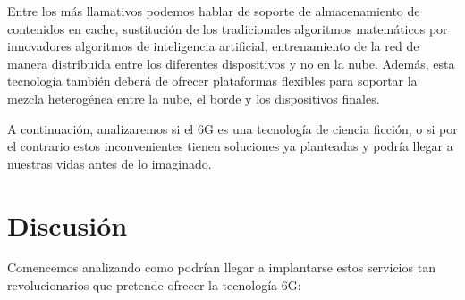 Entre los más llamativos podemos hablar de soporte de almacenamiento de contenidos en cache, sustitución de los tradicionales algoritmos matemáticos por innovadores algoritmos de inteligencia artificial, entrenamiento de la red de manera distribuida entre los diferentes dispositivos y no en la nube. Además, esta tecnología también deberá de ofrecer plataformas flexibles para soportar la mezcla heterogénea entre la nube, el borde y los dispositivos finales.

A continuación, analizaremos si el 6G es una tecnología de ciencia ficción, o si por el contrario estos inconvenientes tienen soluciones ya planteadas y podría llegar a nuestras vidas antes de lo imaginado.

\section{Discusión}
\label{sec:discusion}
Comencemos analizando como podrían llegar a implantarse estos servicios tan revolucionarios que pretende ofrecer la tecnología 6G:
